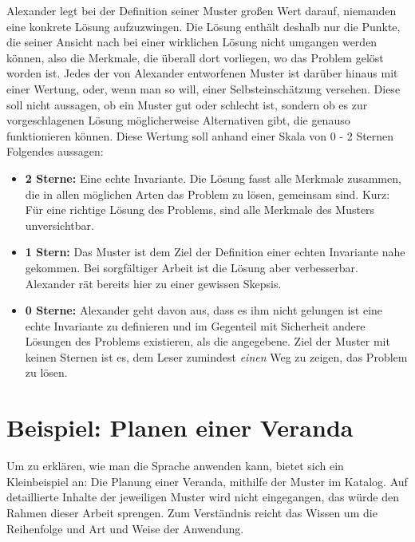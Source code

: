 \documentclass[fontsize=11pt,a4paper,final]{scrreprt}[2003/01/01]
\begin{document}
Alexander legt bei der Definition seiner Muster großen Wert darauf, niemanden eine konkrete Lösung aufzuzwingen. Die Lösung enthält deshalb nur die Punkte, die seiner Ansicht nach bei einer wirklichen Lösung nicht umgangen werden können, also die Merkmale, die überall dort vorliegen, wo das Problem gelöst worden ist. Jedes der von Alexander entworfenen Muster ist darüber hinaus mit einer Wertung, oder, wenn man so will, einer  Selbsteinschätzung versehen. Diese soll nicht aussagen, ob ein Muster gut oder schlecht ist, sondern ob es zur vorgeschlagenen Lösung möglicherweise Alternativen gibt, die genauso funktionieren können. Diese Wertung soll anhand einer Skala von 0 - 2 Sternen Folgendes aussagen:
\begin{itemize}
	\item \textbf{2 Sterne:} Eine echte Invariante. Die Lösung fasst alle Merkmale zusammen, die in allen möglichen Arten das Problem zu lösen, gemeinsam sind. Kurz: Für eine richtige Lösung des Problems, sind alle Merkmale des Musters unversichtbar.
	\item \textbf{1 Stern:} Das Muster ist dem Ziel der Definition einer echten Invariante nahe gekommen. Bei sorgfältiger Arbeit ist die Lösung aber verbesserbar. Alexander rät bereits hier zu einer gewissen Skepsis.
	\item \textbf{0 Sterne:} Alexander geht davon aus, dass es ihm nicht gelungen ist eine echte Invariante zu definieren und im Gegenteil mit Sicherheit andere Lösungen des Problems existieren, als die angegebene. Ziel der Muster mit keinen Sternen ist es, dem Leser zumindest \textit{einen} Weg zu zeigen, das Problem zu lösen.
\end{itemize}

\section{Beispiel: Planen einer Veranda}
Um zu erklären, wie man die Sprache anwenden kann, bietet sich ein Kleinbeispiel an: Die Planung einer Veranda, mithilfe der Muster im Katalog. Auf detaillierte Inhalte der jeweiligen Muster wird nicht eingegangen, das würde den Rahmen dieser Arbeit sprengen. Zum Verständnis reicht das Wissen um die Reihenfolge und Art und Weise der Anwendung. \\ \\
\end{document}
